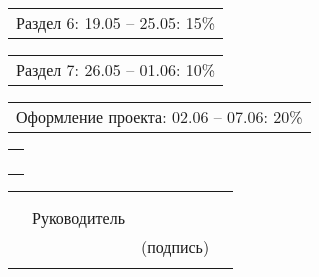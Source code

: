 \documentclass[12pt, А4, twoside]{article}
\begin{document}
\begin{FlushLeft}
    \vspace{-0.1 cm}

    \begin{tabular}{p{17.25cm}}
        \hspace{0.3cm} \textsf{Раздел 6:} \hspace{2.54cm} \textsf{ 19.05 {--} 25.05:} \hspace{0.5cm} \textsf{15\%} \vspace{0pt} \hline \\
    \end{tabular}

    \vspace{-0.1 cm}

    \begin{tabular}{p{17.25cm}}
        \hspace{0.3cm} \textsf{Раздел 7:} \hspace{2.54cm} \textsf{ 26.05 {--} 01.06:} \hspace{0.5cm} \textsf{10\%} \vspace{0pt} \hline \\
    \end{tabular}

    \vspace{-0.1 cm}

    \begin{tabular}{p{17.25cm}}
        \hspace{0.3cm} \textsf{Оформление проекта:} \hspace{0.5cm} \textsf{ 02.06 {--} 07.06:} \hspace{0.5cm} \textsf{20\%} \vspace{0pt} \hline \\
    \end{tabular}

    \begin{tabular}{p{17.25cm}}
        \vspace{0pt} \hline \\
        \vspace{0pt} \hline \\
        \vspace{0pt} \hline \\
        \vspace{0pt} \hline \\
    \end{tabular}

    \begin{tabular}{p{4.2cm} p{3.8cm} p{6.0cm} p{2.0cm}}
        & & &
        \\
        & & &
        \\
        & \fontsize{14}{17.5} \textsf{Руководитель} &
        \vspace{0pt} \hline &
        \\
        & & \centering \fontsize{12}{15} \textsf{(подпись)} &
        \\
        & & &
    \end{tabular}


\end{FlushLeft}
\end{document}

